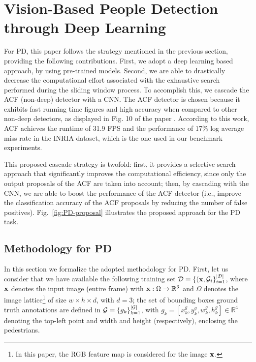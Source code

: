 \documentclass[5p,time]{elsarticle}
\begin{document}
\section{Vision-Based People Detection through Deep Learning}
\label{sec:localization}

For PD, this paper follows the strategy mentioned in the previous section, providing the following contributions. First, we adopt a deep learning based approach, by using pre-trained models.
%
Second, we are able to drastically decrease the computational effort associated with the exhaustive search performed during the sliding window process.
To accomplish this, we cascade the ACF (non-deep) detector \cite{DollarPAMI2014} with a CNN.
The ACF detector is chosen because it exhibits fast running time figures and high  accuracy when compared to other non-deep detectors, as displayed in  Fig. 10 of the paper \cite{DollarPAMI2014}. According to this work, ACF achieves the runtime of 31.9 FPS and the performance of 17$\%$ log average miss rate in the INRIA dataset, which is the one used in our benchmark experiments.

This proposed cascade strategy is twofold: first, it provides a selective search approach that significantly improves the computational efficiency, since only the output proposals of the ACF are taken into account; then, by cascading with the CNN, we are able to boost the performance of the ACF detector (i.e., improve the classification accuracy of the ACF proposals by reducing the number of false positives).
Fig.~\ref{fig:PD-proposal} illustrates the proposed approach for the PD task.

\subsection{Methodology for PD}
\label{sec:Methodology-for-PD}

In this section we formalize the adopted methodology for PD. First, let us consider that we have available
the following training set ${\cal D}=\{ ({\bf x},{\cal G}_i\}_{i=1}^{|\cal D|}$, where ${\bf x}$ denotes the input image (entire frame) with ${\bf x}:\Omega\rightarrow\mathbb{R}^3$ and $\Omega$ denotes the image lattice\footnote{In this paper, the RGB feature map is considered for the image ${\bf x}$.} of size $w \times h\times d$, with $d=3$; the set of bounding boxes ground truth annotations are defined in ${\cal G}=\{g_k\}_{k=1}^{|{\cal G}|}$, with $g_k=[x^g_k,y^g_k,w^g_k,h^g_k]\in\mathbb{R}^{4}$ denoting the top-left point and width and height (respectively), enclosing the pedestrians.
\end{document}
